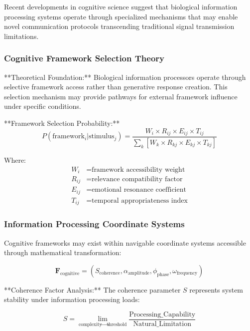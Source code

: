 \documentclass[12pt,a4paper]{article}
\begin{document}
Recent developments in cognitive science suggest that biological information processing systems operate through specialized mechanisms that may enable novel communication protocols transcending traditional signal transmission limitations.

\subsubsection{Cognitive Framework Selection Theory}

**Theoretical Foundation:** Biological information processors operate through selective framework access rather than generative response creation. This selection mechanism may provide pathways for external framework influence under specific conditions.

**Framework Selection Probability:**
\begin{equation}
P(\text{framework}_i | \text{stimulus}_j) = \frac{W_i \times R_{ij} \times E_{ij} \times T_{ij}}{\sum_k[W_k \times R_{kj} \times E_{kj} \times T_{kj}]}
\label{eq:framework_selection}
\end{equation}

Where:
\begin{align}
W_i &= \text{framework accessibility weight} \\
R_{ij} &= \text{relevance compatibility factor} \\
E_{ij} &= \text{emotional resonance coefficient} \\
T_{ij} &= \text{temporal appropriateness index}
\end{align}

\subsubsection{Information Processing Coordinate Systems}

Cognitive frameworks may exist within navigable coordinate systems accessible through mathematical transformation:

\begin{equation}
\mathbf{F}_{\text{cognitive}} = (S_{\text{coherence}}, \alpha_{\text{amplitude}}, \phi_{\text{phase}}, \omega_{\text{frequency}})
\label{eq:cognitive_coordinates}
\end{equation}

**Coherence Factor Analysis:** The coherence parameter $S$ represents system stability under information processing loads:

\begin{equation}
S = \lim_{\text{complexity} \to \text{threshold}} \frac{\text{Processing\_Capability}}{\text{Natural\_Limitation}}
\label{eq:coherence_factor}
\end{equation}
\end{document}

